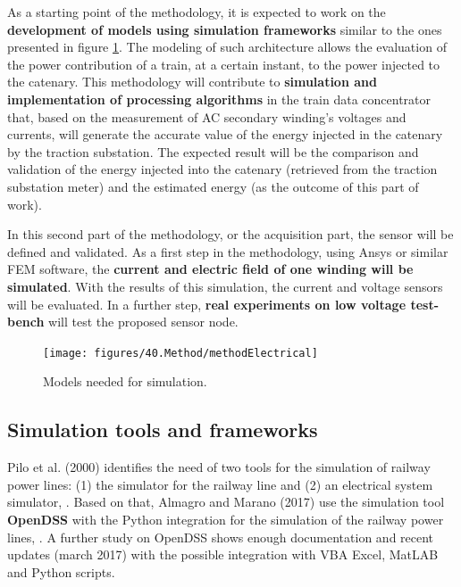 As a starting point of the methodology, it is expected to work on the \textbf{development of models using simulation frameworks} similar to the ones presented in figure \ref{fig:4.methodElectrical}. The modeling of such architecture allows the evaluation of the power contribution of a train, at a certain instant, to the power injected to the catenary. This methodology will contribute to \textbf{simulation and implementation of processing algorithms} in the train data concentrator that, based on the measurement of \ac{AC} secondary winding's voltages and currents, will generate the accurate value of the energy injected in the catenary by the traction substation. The expected result will be the comparison and validation of the energy injected into the catenary (retrieved from the traction substation meter) and the estimated energy (as the outcome of this part of work).

In this second part of the methodology, or the acquisition part, the sensor will be defined and validated. As a first step in the methodology, using Ansys or similar \ac{FEM} software, the \textbf{current and electric field of one winding will be simulated}. With the results of this simulation, the current and voltage sensors will be evaluated. In a further step, \textbf{real experiments on low voltage test-bench} will test the proposed sensor node.



\begin{figure}[h!]
	\centering
	\texttt{[image: figures/40.Method/methodElectrical]}
	\caption{Models needed for simulation.}
	\label{fig:4.methodElectrical}
\end{figure}



\subsection{Simulation tools and frameworks}

Pilo et al. (2000) identifies the need of two tools for the simulation of railway power lines: (1) the simulator for the railway line and (2) an electrical system simulator, \cite{pilo2000}. Based on that,  Almagro and
Marano (2017) use the simulation tool \textbf{OpenDSS} with the Python integration for the simulation of the railway power lines, \cite{almagro2017}. A further study on OpenDSS shows enough documentation and recent updates (march 2017) with the possible integration with VBA Excel, MatLAB and Python scripts.

